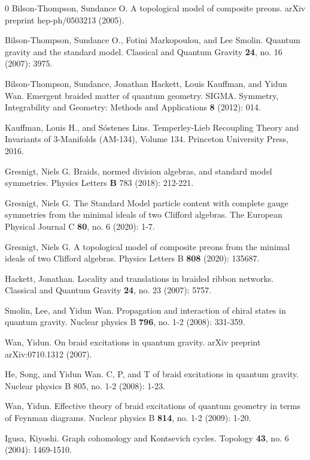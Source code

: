 \documentclass[aps,nofootinbib,amsfonts,superscriptaddress]{revtex4}
\begin{document}
\begin{thebibliography}{0}
Bilson-Thompson, Sundance O. A topological model of composite preons. arXiv preprint hep-ph/0503213 (2005).

Bilson-Thompson, Sundance O., Fotini Markopoulou, and Lee Smolin. Quantum gravity and the standard model. Classical and Quantum Gravity {\bf 24}, no. 16 (2007): 3975.

Bilson-Thompson, Sundance, Jonathan Hackett, Louis Kauffman, and Yidun Wan. Emergent braided matter of quantum geometry. SIGMA. Symmetry, Integrability and Geometry: Methods and Applications {\bf 8} (2012): 014.

Kauffman, Louis H., and Sóstenes Lins. Temperley-Lieb Recoupling Theory and Invariants of 3-Manifolds (AM-134), Volume 134. Princeton University Press, 2016.

Gresnigt, Niels G. Braids, normed division algebras, and standard model symmetries. Physics Letters {\bf B} 783 (2018): 212-221.

Gresnigt, Niels G. The Standard Model particle content with complete gauge symmetries from the minimal ideals of two Clifford algebras. The European Physical Journal C {\bf 80}, no. 6 (2020): 1-7.

Gresnigt, Niels G. A topological model of composite preons from the minimal ideals of two Clifford algebras. Physics Letters B {\bf 808} (2020): 135687.

Hackett, Jonathan. Locality and translations in braided ribbon networks. Classical and Quantum Gravity {\bf 24}, no. 23 (2007): 5757.

Smolin, Lee, and Yidun Wan. Propagation and interaction of chiral states in quantum gravity. Nuclear physics B {\bf 796}, no. 1-2 (2008): 331-359.

Wan, Yidun. On braid excitations in quantum gravity. arXiv preprint arXiv:0710.1312 (2007).

He, Song, and Yidun Wan. C, P, and T of braid excitations in quantum gravity. Nuclear physics B 805, no. 1-2 (2008): 1-23.

Wan, Yidun. Effective theory of braid excitations of quantum geometry in terms of Feynman diagrams. Nuclear physics B {\bf 814}, no. 1-2 (2009): 1-20.

Igusa, Kiyoshi. Graph cohomology and Kontsevich cycles. Topology {\bf 43}, no. 6 (2004): 1469-1510.


\end{thebibliography}
\end{document}
